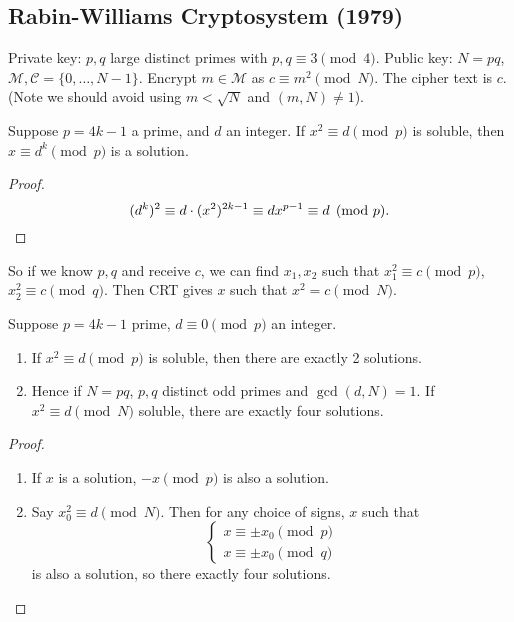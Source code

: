 \documentclass{article}
\newcommand{\1}[1]{\mathbbm{1}_{#1}}
\begin{document}
\subsection{Rabin-Williams Cryptosystem (1979)}
Private key: $p, q$ large distinct primes with $p,q \equiv 3 \pmod{4}$.
Public key: $N = pq$, $\mathcal{M}, \mathcal{C}=\{0, \dotsc, N-1\}$.
Encrypt $m \in \mathcal{M}$ as $c \equiv m^2 \pmod{N}$. The cipher text is $c$.
(Note we should avoid using $m < \sqrt{N}$ and $(m, N) \neq 1$).

\begin{nlemma}\label{lem:3.4}
    Suppose $p = 4k-1$ a prime, and $d$ an integer. If $x^2 \equiv d \pmod{p}$ is soluble, then $x \equiv d^k \pmod{p}$ is a solution.
\end{nlemma}
\begin{proof}
    \begin{equation*}
        (d^k)^2 \equiv d \cdot (x^2)^{2k-1} \equiv d x^{p-1} \equiv d \pmod{p}. \qedhere
    \end{equation*}
\end{proof}
So if we know $p,q$ and receive $c$, we can find $x_1, x_2$ such that $x_1^2 \equiv c \pmod{p}$, $x_2^2 \equiv c \pmod{q}$.
Then CRT gives $x$ such that $x^2 = c \pmod{N}$.
\begin{nlemma}\label{lem:3.5}
    Suppose $p = 4k-1$ prime, $d\equiv 0 \pmod{p}$ an integer.
    \begin{enumerate} [label=(\roman*)]
        \item If $x^2 \equiv d \pmod{p}$ is soluble, then there are exactly 2 solutions.
        \item Hence if $N=pq$, $p,q$ distinct odd primes and $\gcd(d, N) = 1$. If $x^2 \equiv d \pmod{N}$ soluble, there are exactly four solutions.
    \end{enumerate}
\end{nlemma}
\begin{proof}\leavevmode
    \begin{enumerate} [label=(\roman*)]
        \item If $x$ is a solution, $-x \pmod{p}$ is also a solution.
        \item Say $x_0^2 \equiv d \pmod{N}$. Then for any choice of signs, $x$ such that
            \begin{equation*}
                \begin{cases}
                    x \equiv \pm x_0 \pmod{p} \\
                    x \equiv \pm x_0 \pmod{q}
                \end{cases}
            \end{equation*}
            is also a solution, so there exactly four solutions. \qedhere
    \end{enumerate}
\end{proof}
\end{document}
